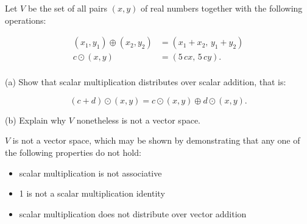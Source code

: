 
\begin{exerciseStatement}


 Let \(V\) be the set of all pairs \((x,y)\) of real numbers together with the following operations: 


\begin{align*} (x_1,y_1)\oplus (x_2,y_2)&= \left(x_{1} + x_{2},\,y_{1} + y_{2}\right)  \\c \odot (x,y) &= \left(5 \, c x,\,5 \, c y\right) . \\ \end{align*}
            

 (a) Show that scalar multiplication distributes over scalar addition, that is: 

\[(c+d)\odot(x,y)=c\odot(x,y)\oplus d\odot (x,y).
    \]

 (b) Explain why \(V\) nonetheless is not a vector space. 


\end{exerciseStatement}
    
\begin{exerciseAnswer} 


\(V\) is not a vector space, which may be shown by demonstrating that any one of the following properties do not hold: 


\begin{itemize}
\item scalar multiplication is not associative
\item 1 is not a scalar multiplication identity
\item scalar multiplication does not distribute over vector addition
\end{itemize}
    
\end{exerciseAnswer}
    
